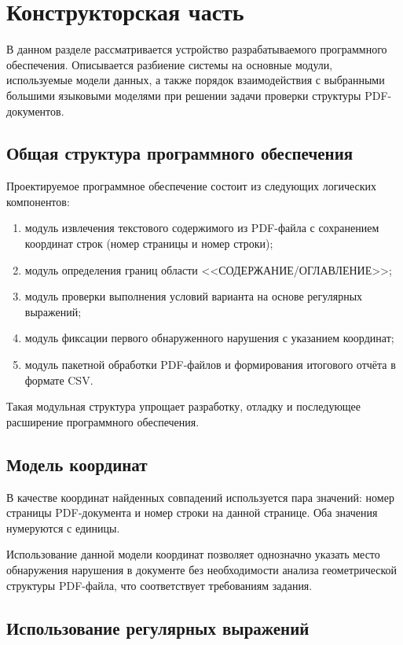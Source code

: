 \chapter{Конструкторская часть}

В данном разделе рассматривается устройство разрабатываемого программного
обеспечения. Описывается разбиение системы на основные модули, используемые
модели данных, а также порядок взаимодействия с выбранными большими
языковыми моделями при решении задачи проверки структуры PDF-документов.

\section{Общая структура программного обеспечения}

Проектируемое программное обеспечение состоит из следующих логических компонентов:
\begin{enumerate}
    \item модуль извлечения текстового содержимого из PDF-файла с сохранением
    координат строк (номер страницы и номер строки);
    \item модуль определения границ области <<СОДЕРЖАНИЕ/ОГЛАВЛЕНИЕ>>;
    \item модуль проверки выполнения условий варианта на основе регулярных выражений;
    \item модуль фиксации первого обнаруженного нарушения с указанием координат;
    \item модуль пакетной обработки PDF-файлов и формирования итогового отчёта
    в формате CSV.
\end{enumerate}

Такая модульная структура упрощает разработку, отладку и последующее расширение
программного обеспечения.

\section{Модель координат}

В качестве координат найденных совпадений используется пара значений:
номер страницы PDF-документа и номер строки на данной странице.
Оба значения нумеруются с единицы.

Использование данной модели координат позволяет однозначно указать место
обнаружения нарушения в документе без необходимости анализа геометрической
структуры PDF-файла, что соответствует требованиям задания.

\section{Использование регулярных выражений}

